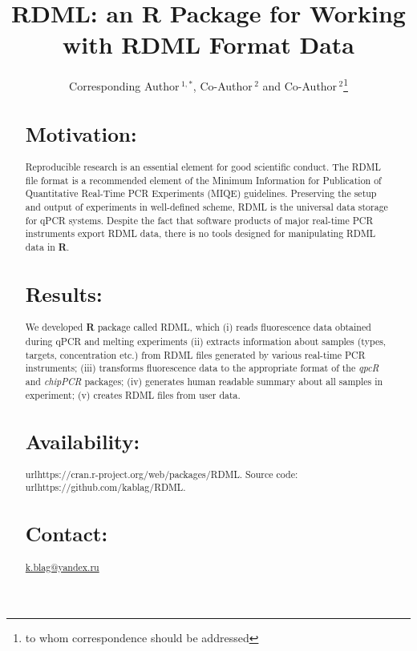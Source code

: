 \documentclass{bioinfo}
\begin{document}
	
	\title[RDML]{RDML: an \textbf{R} Package for Working with RDML Format Data}
	\author[Sample \textit{et~al}]{Corresponding Author\,$^{1,*}$, Co-Author\,$^{2}$
		and Co-Author\,$^2$\footnote{to whom correspondence should be addressed}}
	\address{$^{1}$Department of XXXXXXX, Address XXXX etc.\\ $^{2}$Department of
		XXXXXXXX, Address XXXX etc.}
	
	
	
	\maketitle
	
	\begin{abstract}
		
		\section{Motivation:} Reproducible research is an essential 
		element for good scientific conduct. The RDML file format is a recommended 
		element of the Minimum Information for Publication of Quantitative Real-Time PCR 
		Experiments (MIQE) guidelines. Preserving the setup and output of experiments in 
		well-defined scheme, RDML is the universal data storage for qPCR systems. 
		Despite the fact that software products of major real-time PCR instruments 
		export RDML data, there is no tools designed for manipulating RDML data in 
		\textbf{R}.
		
		\section{Results:} We developed \textbf{R} package called RDML, which (i) reads
		fluorescence data obtained during qPCR and melting experiments (ii) extracts
		information about samples (types, targets, concentration etc.) from RDML files
		generated by various real-time PCR instruments; (iii) transforms fluorescence
		data to the appropriate format of the \textit{qpcR} and \textit{chipPCR}
		packages; (iv) generates human readable summary about all samples in experiment;
		(v) creates RDML files from user data. \section{Availability:}
		url{https://cran.r-project.org/web/packages/RDML}. Source code:
		url{https://github.com/kablag/RDML}. \section{Contact:}
		\href{k.blag@yandex.ru}{k.blag@yandex.ru} \end{abstract}
	
\end{document}
